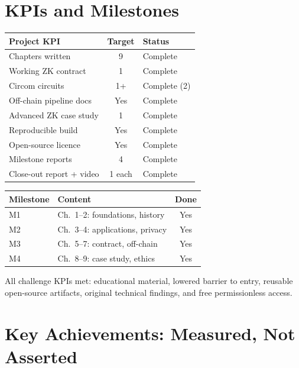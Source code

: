 \documentclass[10pt,a4paper]{article}
\begin{document}
\section{KPIs and Milestones}

\begin{minipage}[t]{0.46\textwidth}
\begin{tabular}{@{}l c l@{}}
\toprule
\textbf{Project KPI} & \textbf{Target} & \textbf{Status} \\
\midrule
Chapters written            & 9      & Complete \\
Working ZK contract         & 1      & Complete \\
Circom circuits             & 1+     & Complete (2) \\
Off-chain pipeline docs     & Yes    & Complete \\
Advanced ZK case study      & 1      & Complete \\
Reproducible build          & Yes    & Complete \\
Open-source licence         & Yes    & Complete \\
Milestone reports           & 4      & Complete \\
Close-out report + video    & 1 each & Complete \\
\bottomrule
\end{tabular}
\end{minipage}\hfill
\begin{minipage}[t]{0.50\textwidth}
\begin{tabular}{@{}l l c@{}}
\toprule
\textbf{Milestone} & \textbf{Content} & \textbf{Done} \\
\midrule
M1 & Ch.\ 1--2: foundations, history   & Yes \\
M2 & Ch.\ 3--4: applications, privacy  & Yes \\
M3 & Ch.\ 5--7: contract, off-chain    & Yes \\
M4 & Ch.\ 8--9: case study, ethics     & Yes \\
\bottomrule
\end{tabular}

\vspace{0.5em}
{\footnotesize All challenge KPIs met: educational material, lowered barrier to
entry, reusable open-source artifacts, original technical findings, and free
permissionless access.}
\end{minipage}

\section{Key Achievements: Measured, Not Asserted}
\end{document}
